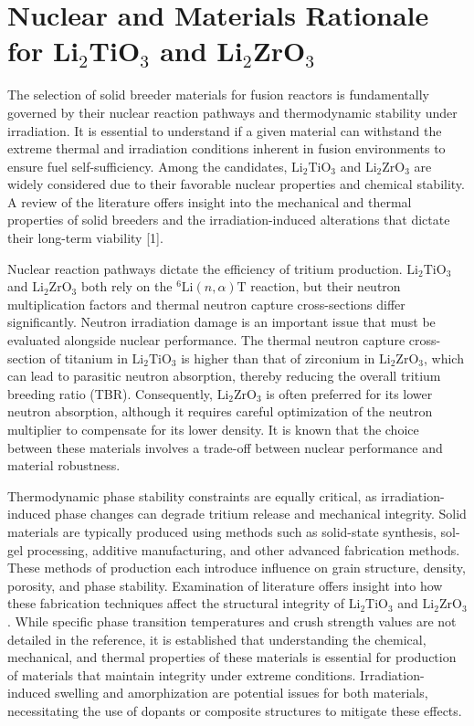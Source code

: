 \documentclass[review,12pt,a4paper]{elsarticle}
\begin{document}
\section{Nuclear and Materials Rationale for Li$_{2}$TiO$_{3}$ and Li$_{2}$ZrO$_{3}$}


\textcolor{highconf}{The selection of solid breeder materials for fusion reactors is fundamentally governed by their nuclear reaction pathways and thermodynamic stability under irradiation. It is essential to understand if a given material can withstand the extreme thermal and irradiation conditions inherent in fusion environments to ensure fuel self-sufficiency. Among the candidates, $\mathrm{Li_2TiO_3}$ and $\mathrm{Li_2ZrO_3}$ are widely considered due to their favorable nuclear properties and chemical stability. A review of the literature offers insight into the mechanical and thermal properties of solid breeders and the irradiation-induced alterations that dictate their long-term viability [1].}

\textcolor{highconf}{Nuclear reaction pathways dictate the efficiency of tritium production. $\mathrm{Li_2TiO_3}$ and $\mathrm{Li_2ZrO_3}$ both rely on the $^6\mathrm{Li}(n,\alpha)\mathrm{T}$ reaction, but their neutron multiplication factors and thermal neutron capture cross-sections differ significantly. Neutron irradiation damage is an important issue that must be evaluated alongside nuclear performance. The thermal neutron capture cross-section of titanium in $\mathrm{Li_2TiO_3}$ is higher than that of zirconium in $\mathrm{Li_2ZrO_3}$, which can lead to parasitic neutron absorption, thereby reducing the overall tritium breeding ratio (TBR). Consequently, $\mathrm{Li_2ZrO_3}$ is often preferred for its lower neutron absorption, although it requires careful optimization of the neutron multiplier to compensate for its lower density. It is known that the choice between these materials involves a trade-off between nuclear performance and material robustness.}

\textcolor{highconf}{Thermodynamic phase stability constraints are equally critical, as irradiation-induced phase changes can degrade tritium release and mechanical integrity. Solid materials are typically produced using methods such as solid-state synthesis, sol-gel processing, additive manufacturing, and other advanced fabrication methods. These methods of production each introduce influence on grain structure, density, porosity, and phase stability. Examination of literature offers insight into how these fabrication techniques affect the structural integrity of $\mathrm{Li_2TiO_3}$ and $\mathrm{Li_2ZrO_3}$. While specific phase transition temperatures and crush strength values are not detailed in the reference, it is established that understanding the chemical, mechanical, and thermal properties of these materials is essential for production of materials that maintain integrity under extreme conditions. Irradiation-induced swelling and amorphization are potential issues for both materials, necessitating the use of dopants or composite structures to mitigate these effects.}
\end{document}

